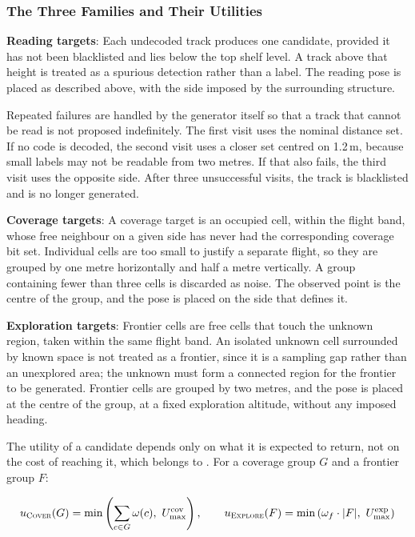 \subsubsection*{The Three Families and Their Utilities}

\textbf{Reading targets}: Each undecoded track produces one candidate, provided it
has not been blacklisted and lies below the top shelf level. A track above that
height is treated as a spurious detection rather than a label. The reading pose
is placed as described above, with the side imposed by the surrounding structure.

Repeated failures are handled by the generator itself so that a track that cannot
be read is not proposed indefinitely. The first visit uses the nominal distance
set. If no code is decoded, the second visit uses a closer set centred on
1.2\,m, because small labels may not be readable from two metres. If that also
fails, the third visit uses the opposite side. After three unsuccessful visits,
the track is blacklisted and is no longer generated.

\textbf{Coverage targets}: A coverage target is an occupied cell, within the
flight band, whose free neighbour on a given side has never had the corresponding
coverage bit set. Individual cells are too small to justify a separate flight, so
they are grouped by one metre horizontally and half a metre vertically. A group
containing fewer than three cells is discarded as noise. The observed point is
the centre of the group, and the pose is placed on the side that defines it.

\textbf{Exploration targets}: Frontier cells are free cells that touch the
unknown region, taken within the same flight band. An isolated unknown cell
surrounded by known space is not treated as a frontier, since it is a sampling
gap rather than an unexplored area; the unknown must form a connected region for
the frontier to be generated. Frontier cells are grouped by two metres, and the
pose is placed at the centre of the group, at a fixed exploration altitude,
without any imposed heading.

The utility of a candidate depends only on what it is expected to return, not on
the cost of reaching it, which belongs to . For a coverage
group $G$ and a frontier group $F$:

\begin{equation}
    u_{\text{\textsc{Cover}}}(G)
    =
    \min\left(
    \sum_{c \in G} \omega(c),\
    U_{\max}^{\text{cov}}
    \right),
    \qquad
    u_{\text{\textsc{Explore}}}(F)
    =
    \min\left(
    \omega_f \cdot \lvert F \rvert,\
    U_{\max}^{\text{exp}}
    \right)
    \label{eq:sys:utility}
\end{equation}

